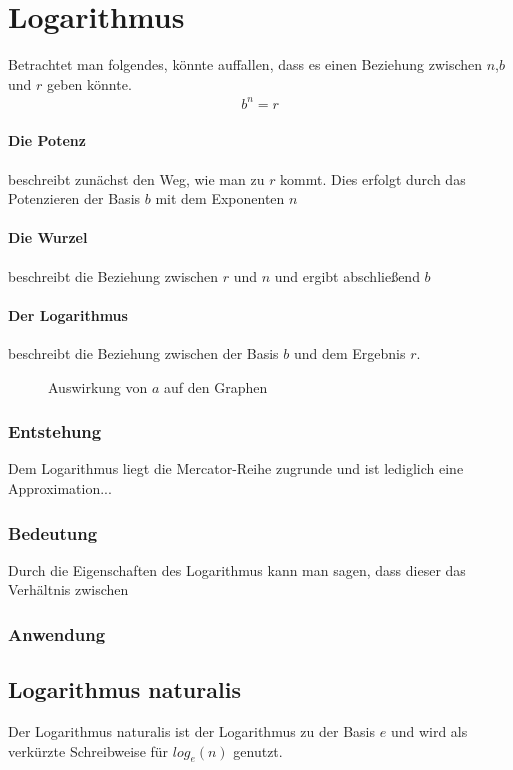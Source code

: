 \pagebreak
\section{Logarithmus}\label{sec:E-Funktion/Logarithmus}
Betrachtet man folgendes, könnte auffallen, dass es einen Beziehung zwischen $n$,$b$ und $r$ geben könnte.  
\begin{align*}
	b^n=r
\end{align*}
\paragraph{Die Potenz} beschreibt zunächst den Weg, wie man zu $r$ kommt. Dies erfolgt durch das Potenzieren der Basis $b$ mit dem Exponenten $n$
\paragraph{Die Wurzel} beschreibt die Beziehung zwischen $r$ und $n$ und ergibt abschließend $b$
\paragraph{Der Logarithmus} beschreibt die Beziehung zwischen der Basis $b$ und dem Ergebnis $r$.
\begin{figure}[h]
	\centering
	
	\caption{Auswirkung von $a$ auf den Graphen}
\end{figure}
\subsubsection{Entstehung}\label{sec:E-Funktion/Logarithmus/Entstehung}
Dem Logarithmus liegt die Mercator-Reihe zugrunde und ist lediglich eine Approximation... 
\subsubsection{Bedeutung}\label{sec:E-Funktion/Logarithmus/Bedeutung}
Durch die Eigenschaften des Logarithmus kann man sagen, dass dieser das Verhältnis zwischen 
\subsubsection{Anwendung}\label{sec:E-Funktion/Logarithmus/Anwendung}
\subsection{Logarithmus naturalis} Der Logarithmus naturalis ist der Logarithmus zu der Basis $e$ und wird als verkürzte Schreibweise für $log_e(n)$ genutzt. 
